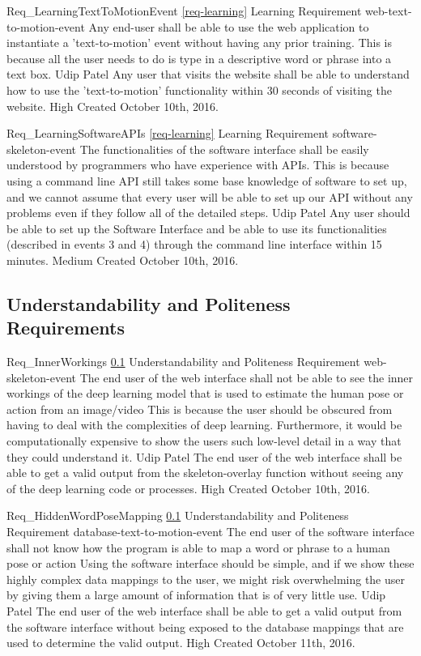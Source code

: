 \documentclass{scrreprt}
\begin{document}
\requirement
{Req_LearningTextToMotionEvent}
{\ref{req-learning} Learning Requirement}
{web-text-to-motion-event}
{Any end-user shall be able to use the web application to instantiate a 'text-to-motion' event without having any prior training.}
{This is because all the user needs to do is type in a descriptive word or phrase into a text box.}
{Udip Patel}
{Any user that visits the website shall be able to understand how to use the 'text-to-motion' functionality within 30 seconds of visiting the website.}
{High}
{Created October 10th, 2016.}

\requirement
{Req_LearningSoftwareAPIs}
{\ref{req-learning} Learning Requirement}
{software-skeleton-event} %
{The functionalities of the software interface shall be easily understood by programmers who have experience with APIs.}
{This is because using a command line API still takes some base knowledge of software to set up, and we cannot assume that every user will be able to set up our API without any problems even if they follow all of the detailed steps.}
{Udip Patel}
{Any user should be able to set up the Software Interface and be able to use its functionalities (described in events 3 and 4) through the command line interface within 15 minutes.}
{Medium}
{Created October 10th, 2016.}

\subsection{Understandability and Politeness Requirements}
\label{req-understandability-politeness}

\requirement
{Req_InnerWorkings}
{\ref{req-understandability-politeness} Understandability and Politeness Requirement}
{web-skeleton-event}
{The end user of the web interface shall not be able to see the inner workings
of the deep learning model that is used to estimate the human pose or action
from an image/video}
{This is because the user should be obscured from having to deal with the
complexities of deep learning. Furthermore, it would be computationally
expensive to show the users such low-level detail in a way that they could
understand it.}
{Udip Patel}
{The end user of the web interface shall be able to get a valid output from the
skeleton-overlay function without seeing any of the deep learning code or
processes.}
{High}
{Created October 10th, 2016.}

\requirement
{Req_HiddenWordPoseMapping}
{\ref{req-understandability-politeness} Understandability and Politeness Requirement}
{database-text-to-motion-event}
{The end user of the software interface shall not know how the program is able
to map a word or phrase to a human pose or action}
{Using the software interface should be simple, and if we show these highly
complex data mappings to the user, we might risk overwhelming the user by
giving them a large amount of information that is of very little use.}
{Udip Patel}
{The end user of the web interface shall be able to get a valid output from the
software interface without being exposed to the database mappings that are used
to determine the valid output.}
{High}
{Created October 11th, 2016.}
\end{document}
